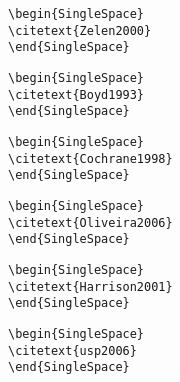 \begin{alineas}
\begin{verbatim}
\begin{SingleSpace} 
\citetext{Zelen2000}
\end{SingleSpace}
\end{verbatim}


\begin{verbatim}
\begin{SingleSpace} 
\citetext{Boyd1993}
\end{SingleSpace}
\end{verbatim}


\begin{verbatim}
\begin{SingleSpace} 
\citetext{Cochrane1998}
\end{SingleSpace}
\end{verbatim}


\begin{verbatim}
\begin{SingleSpace} 
\citetext{Oliveira2006}
\end{SingleSpace}
\end{verbatim}


\begin{verbatim}
\begin{SingleSpace} 
\citetext{Harrison2001}
\end{SingleSpace}
\end{verbatim}


\begin{verbatim}
\begin{SingleSpace} 
\citetext{usp2006}
\end{SingleSpace}
\end{verbatim}


\end{alineas}
